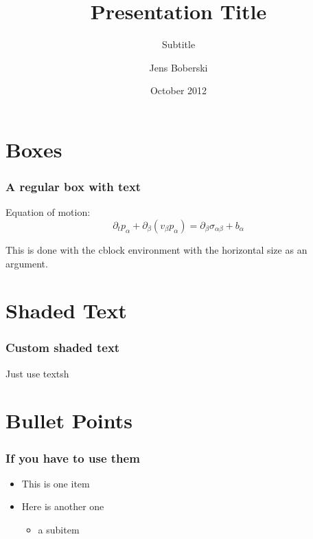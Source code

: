 \documentclass{beamer}
\title{Presentation Title}
\subtitle{Subtitle}
\author{Jens Boberski}
\institute{Universit\"at Duisburg-Essen}
\date{October 2012}
\begin{document}
\titleframe
\outlineframe
 \section{Boxes}
\begin{frame}
  \frametitle{A regular box with text}
  
  \begin{cblock}{6cm}
    Equation of motion:
    \begin{equation*}
      \partial_t p_\alpha + \partial_\beta (v_\beta p_\alpha) = \partial_\beta \sigma_{\alpha \beta} + b_\alpha
    \end{equation*}
    \vspace{-2em}
  \end{cblock}
This is done with the cblock environment with the horizontal size as an argument.
\end{frame}
\section{Shaded Text}
\begin{frame}
    \frametitle{Custom shaded text}

    Just use textsh
\end{frame}


\section{Bullet Points}
\begin{frame}
  \frametitle{If you have to use them}
  \begin{itemize}
    \item This is one item
    \item Here is another one
      \begin{itemize}
        \item a subitem
      \end{itemize}
  \end{itemize}
\end{frame}
\end{document}
